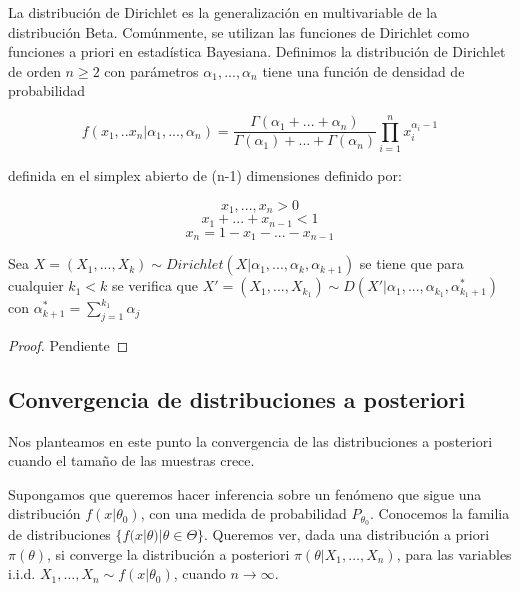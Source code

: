 \documentclass{article}
\begin{document}
La distribución de Dirichlet es la generalización en multivariable de la distribución Beta. Comúnmente, se utilizan las funciones de Dirichlet como funciones a priori en estadística Bayesiana. Definimos la distribución de Dirichlet de orden $n \geq 2$ con parámetros $\alpha_1, ..., \alpha_n$ tiene una función de densidad de probabilidad

\begin{equation*}
f(x_1, .. x_n|\alpha_1, ...,\alpha_n) = \frac{\Gamma(\alpha_1 + ... + \alpha_n)}{\Gamma(\alpha_1) + ... + \Gamma(\alpha_n)} \prod_{i=1}^{n} {x_i ^ {\alpha_i - 1}}
\end{equation*}

definida en el simplex abierto de (n-1) dimensiones definido por:

\begin{equation*}
x_1, ... , x_n > 0
\end{equation*}
\begin{equation*}
x_1 + ... + x_{n-1} < 1
\end{equation*}
\begin{equation*}
x_n =  1 - x_1 - ... - x_{n-1}
\end{equation*}

\begin{thm}
	Sea $X = (X_1, ... , X_k) \sim Dirichlet(X|\alpha_1, ... , \alpha_k, \alpha_{k+1}) $ se tiene que para cualquier $k_1 < k$  se verifica que $X' =  (X_1, ... , X_{k_1}) \sim D(X'|\alpha_1, ... , \alpha_{k_1}, \alpha_{k_1 + 1}^{*}) $ con  $\alpha_{k+1}^{*} =\sum_{j=1}^{k_1} {\alpha_{j}}$
\end{thm}

\begin{proof}
	Pendiente
\end{proof}

\subsection{Convergencia de distribuciones a posteriori} \label{sec:bayes:convergencia}

Nos planteamos en este punto la convergencia de las distribuciones a posteriori cuando el tamaño de las muestras crece.

Supongamos que queremos hacer inferencia sobre un fenómeno que sigue una distribución $f(x|\theta_0)$, con una medida de probabilidad $P_{\theta_0}$. Conocemos la familia de distribuciones $\{f(x|\theta)|\theta\in\Theta\}$. Queremos ver, dada una distribución a priori $\pi(\theta)$, si converge la distribución a posteriori $\pi(\theta|X_1,\dots,X_n)$, para las variables i.i.d. $X_1,\dots,X_n \sim f(x|\theta_0)$,  cuando $n \to \infty$.
\end{document}
